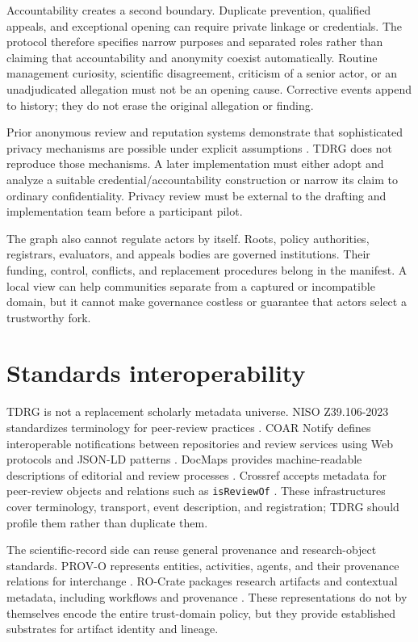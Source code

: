 \documentclass[11pt]{article}
\newcommand{\tdrg}{TDRG}
\begin{document}
Accountability creates a second boundary. Duplicate prevention, qualified appeals,
and exceptional opening can require private linkage or credentials. The protocol
therefore specifies narrow purposes and separated roles rather than claiming that
accountability and anonymity coexist automatically. Routine management curiosity,
scientific disagreement, criticism of a senior actor, or an unadjudicated allegation
must not be an opening cause. Corrective events append to history; they do not erase
the original allegation or finding.

Prior anonymous review and reputation systems demonstrate that sophisticated
privacy mechanisms are possible under explicit assumptions
\citep{naessens2006fair,zhai2016anonrep}. \tdrg{} does not reproduce those
mechanisms. A later implementation must either adopt and analyze a suitable
credential/accountability construction or narrow its claim to ordinary
confidentiality. Privacy review must be external to the drafting and implementation
team before a participant pilot.

The graph also cannot regulate actors by itself. Roots, policy authorities,
registrars, evaluators, and appeals bodies are governed institutions. Their funding,
control, conflicts, and replacement procedures belong in the manifest. A local
view can help communities separate from a captured or incompatible domain, but it
cannot make governance costless or guarantee that actors select a trustworthy fork.

\section{Standards interoperability}

\tdrg{} is not a replacement scholarly metadata universe. NISO Z39.106-2023
standardizes terminology for peer-review practices \citep{niso2023peerreview}.
COAR Notify defines interoperable notifications between repositories and review
services using Web protocols and JSON-LD patterns \citep{coar2024notify}.
DocMaps provides machine-readable descriptions of editorial and review processes
\citep{docmaps2021framework}. Crossref accepts metadata for peer-review objects and
relations such as \texttt{isReviewOf} \citep{crossref2026peerreview}. These
infrastructures cover terminology, transport, event description, and registration;
\tdrg{} should profile them rather than duplicate them.

The scientific-record side can reuse general provenance and research-object
standards. PROV-O represents entities, activities, agents, and their provenance
relations for interchange \citep{lebo2013provo}. RO-Crate packages research
artifacts and contextual metadata, including workflows and provenance
\citep{soilandreyes2022rocrate,rocrate2025spec}. These representations do not by
themselves encode the entire trust-domain policy, but they provide established
substrates for artifact identity and lineage.
\end{document}
